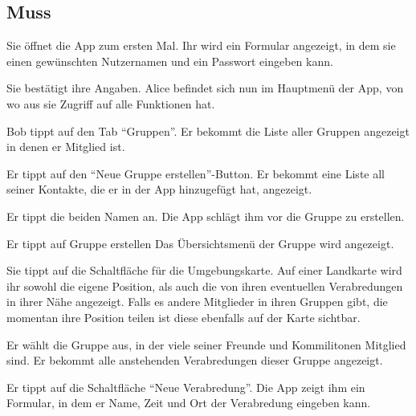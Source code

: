 \documentclass[parskip=full,11pt]{scrartcl}
\begin{document}
\subsection{Muss}

{Sie öffnet die App zum ersten Mal.}
{Ihr wird ein Formular angezeigt, in dem sie einen gewünschten Nutzernamen
und ein Passwort eingeben kann.}

{Sie bestätigt ihre Angaben.}
{Alice befindet sich nun im Hauptmenü der App, von wo aus sie Zugriff auf alle Funktionen hat.}


{Bob tippt auf den Tab  \enquote{Gruppen}.}
{Er bekommt die Liste aller Gruppen angezeigt in denen er Mitglied ist.}

{Er tippt auf den \enquote{Neue Gruppe erstellen}-Button.}
{Er bekommt eine Liste all seiner Kontakte, die er in der App hinzugefügt hat, angezeigt.}

{Er tippt die beiden Namen an.}
{Die App schlägt ihm vor die Gruppe zu erstellen.}

{Er tippt auf Gruppe erstellen}
{Das Übersichtsmenü der Gruppe wird angezeigt.}

{Sie tippt auf die Schaltfläche für die Umgebungskarte.}
{Auf einer Landkarte wird ihr sowohl die eigene Position, als auch die von ihren
eventuellen Verabredungen in ihrer Nähe angezeigt.
Falls es andere Mitglieder in ihren Gruppen gibt, die momentan
ihre Position teilen ist diese ebenfalls auf der Karte sichtbar.}


{Er wählt die Gruppe aus, in der viele seiner Freunde und Kommilitonen Mitglied sind.}
{Er bekommt alle anstehenden Verabredungen dieser Gruppe angezeigt.}

{Er tippt auf die Schaltfläche \enquote{Neue Verabredung}.}
{Die App zeigt ihm ein Formular, in dem er Name, Zeit und Ort der Verabredung eingeben kann.}
\end{document}
